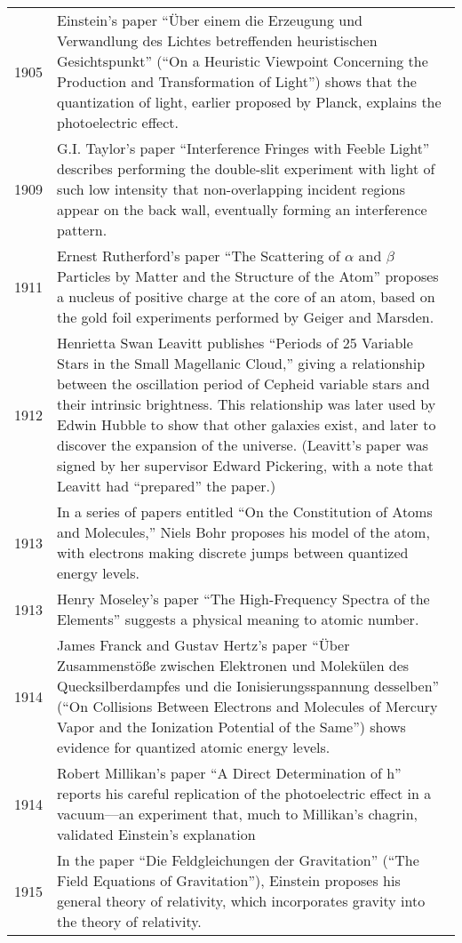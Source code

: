 \documentclass[../main.tex]{subfiles}
\begin{document}
\begin{center}
\begin{longtable}{p{}  p{}}
1905&Einstein's paper “Über einem die Erzeugung und Verwandlung des Lichtes betreffenden heuristischen Gesichtspunkt” (“On a Heuristic Viewpoint Concerning the Production and Transformation of Light”) shows that the quantization of light, earlier proposed by Planck, explains the photoelectric effect.\\
1909&G.I. Taylor's paper “Interference Fringes with Feeble Light” describes performing the double-slit experiment with light of such low intensity that non-overlapping incident regions appear on the back wall, eventually forming an interference pattern.\\
1911&Ernest Rutherford's paper “The Scattering of $\alpha$ and $\beta$ Particles by Matter and the Structure of the Atom” proposes a nucleus of positive charge at the core of an atom, based on the gold foil experiments performed by Geiger and Marsden.\\
1912&Henrietta Swan Leavitt publishes “Periods of 25 Variable Stars in the Small Magellanic Cloud,” giving a relationship between the oscillation period of Cepheid variable stars and their intrinsic brightness. This relationship was later used by Edwin Hubble to show that other galaxies exist, and later to discover the expansion of the universe. (Leavitt's paper was signed by her supervisor Edward Pickering, with a note that Leavitt had “prepared” the paper.)\\
1913&In a series of papers entitled “On the Constitution of Atoms and Molecules,” Niels Bohr proposes his model of the atom, with electrons making discrete jumps between quantized energy levels.\\
1913&Henry Moseley's paper “The High-Frequency Spectra of the Elements” suggests a physical meaning to atomic number. \\
1914&James Franck and Gustav Hertz's paper “Über Zusammenstöße zwischen Elektronen und Molekülen des Quecksilberdampfes und die Ionisierungsspannung desselben” (“On Collisions Between Electrons and Molecules of Mercury Vapor and the Ionization Potential of the Same”) shows evidence for quantized atomic energy levels.\\
1914&Robert Millikan's paper “A Direct Determination of h” reports his careful replication of the photoelectric effect in a vacuum—an experiment that, much to Millikan's chagrin, validated Einstein's explanation\\
1915&In the paper “Die Feldgleichungen der Gravitation” (“The Field Equations of Gravitation”), Einstein proposes his general theory of relativity, which incorporates gravity into the theory of relativity.\\

\end{longtable}
\end{center}
\end{document}
